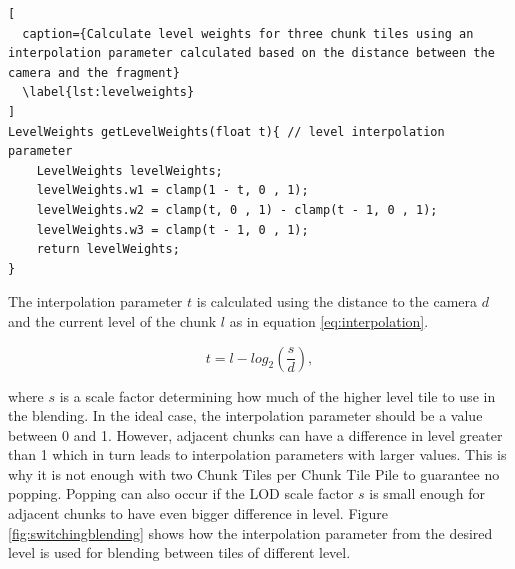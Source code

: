 \begin{lstlisting}[
  caption={Calculate level weights for three chunk tiles using an interpolation parameter calculated based on the distance between the camera and the fragment}
  \label{lst:levelweights}
]
LevelWeights getLevelWeights(float t){ // level interpolation parameter
	LevelWeights levelWeights;
	levelWeights.w1 = clamp(1 - t, 0 , 1);
	levelWeights.w2 = clamp(t, 0 , 1) - clamp(t - 1, 0 , 1);
	levelWeights.w3 = clamp(t - 1, 0 , 1);
	return levelWeights;
}
\end{lstlisting}

The interpolation parameter $t$ is calculated using the distance to the camera $d$ and the current level of the chunk $l$ as in equation \ref{eq:interpolation}.

\begin{equation}
\label{eq:interpolation}
t = l-log_2(\frac{s}{d}),
\end{equation}

where $s$ is a scale factor determining how much of the higher level tile to use in the blending. In the ideal case, the interpolation parameter should be a value between 0 and 1. However, adjacent chunks can have a difference in level greater than 1 which in turn leads to interpolation parameters with larger values. This is why it is not enough with two Chunk Tiles per Chunk Tile Pile to guarantee no popping. Popping can also occur if the LOD scale factor $s$ is small enough for adjacent chunks to have even bigger difference in level. Figure \ref{fig:switchingblending} shows how the interpolation parameter from the desired level is used for blending between tiles of different level.

